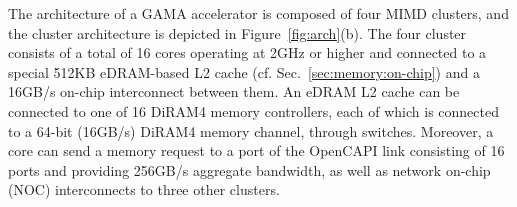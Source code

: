 
The architecture of a GAMA accelerator is composed of four MIMD clusters, and the cluster architecture is depicted in Figure~\ref{fig:arch}(b).
The four cluster consists of a total of 16 cores operating at 2GHz or higher and connected to a special 512KB eDRAM-based L2 cache (cf. Sec.~\ref{sec:memory:on-chip}) and a 16GB/s on-chip interconnect between them. 
An eDRAM L2 cache can be connected to one of 16 DiRAM4 memory controllers, each of which is connected to a 64-bit (16GB/s) DiRAM4 memory channel, through switches.
Moreover, a core can send a memory request to a port of the OpenCAPI link consisting of 16 ports and providing 256GB/s aggregate bandwidth, 
as well as network on-chip (NOC) interconnects to three other clusters.  

